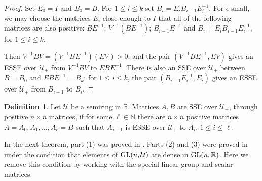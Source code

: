 \documentclass{amsart}
\theoremstyle{definition}
\newtheorem{definition}[theorem]{Definition}
\theoremstyle{remark}
\newcommand{\ri}{\mathcal U}
\numberwithin{equation}{section}
\begin{document}
{{\begin{proof}
Set $E_0=I$ and $B_0=B$. 
For $1\leq i \leq k$ set $B_i=E_iB_{i-1}E_i^{-1}$. 
For $\epsilon$ small, we may choose the matrices 
$E_i$ close enough to $I$ that all of the following matrices 
are also positive: 
$BE^{-1}$; $V^{-1}(BE^{-1})$; $B_{i-1}E^{-1}$ and 
$B_i=E_iB_{i-1}E_i^{-1}$, for $1\leq i\leq k$.  


Then $V^{-1}BV= (V^{-1}BE^{-1})( EV) > 0$, and  
the pair $(V^{-1}BE^{-1}, EV)$ gives 
an  ESSE over $\ri_+$ from 
$V^{-1}BV$  to  $EBE^{-1}$. There is also 
an SSE over $\ri_+$ between $B=B_0$ and 
$EBE^{-1}=B_k$: 
for $1\leq i\leq k$, 
the pair $(B_{i-1}E_i^{-1},E_i)$ gives  
an  ESSE over $\ri_+$ from $B_{i-1}$ to $B_i$. 

\end{proof} 


 \begin{definition} \label{throughpositivedefinition}
Let $\ri$ be a semiring in $\mathbb R$. 
Matrices $A,B$ are SSE over $\ri_+$,  
through positive $n\times n$ matrices,  if for 
some $\ell\in \mathbb N$ there are $n\times n$ 
positive matrices   
$A=A_0, A_1, \dots , A_{\ell}=B$ such that 
$A_{i-1} $ is ESSE over $\ri_+$ to $A_i$, $1\leq i \leq \ell$.  
\end{definition} 

In the next theorem, part (1)  was proved in \cite{KR3}. 
Parts (2) and (3) were 
 proved in \cite{KR4} 
under the condition 
that elements of $\textnormal{GL}(n,\mathcal U)$ are dense in $\textnormal{GL}(n,\mathbb R)$.  
Here we remove this 
condition by working with the special linear group and scalar matrices.

}}
\end{document}

